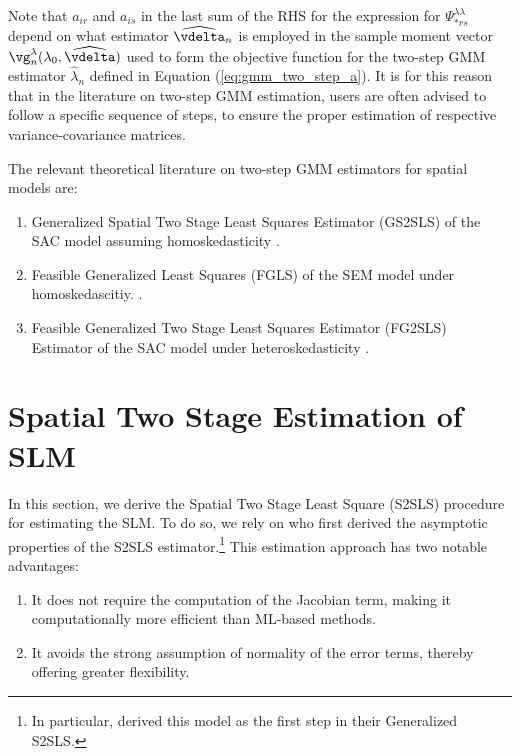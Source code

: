\documentclass[english,12pt]{book}\usepackage[]{graphicx}\usepackage[]{xcolor}
\begin{document}
Note that $a_{ir}$ and $a_{is}$ in the last sum of the RHS for the expression for $\Psi_{*rs}^{\lambda\lambda}$ depend on what estimator $\widehat{\vdelta}_n$ is employed in the sample moment vector $\vg_n^{\lambda}(\lambda_0, \widehat{\vdelta})$ used to form the objective function for the two-step GMM estimator $\widehat{\lambda}_n$ defined in Equation (\ref{eq:gmm_two_step_a}). It is for this reason that in the literature on two-step GMM estimation, users are often advised to follow a specific sequence of steps, to ensure the proper estimation of respective variance-covariance matrices. 

The relevant theoretical literature on two-step GMM estimators for spatial models are:
\begin{enumerate}
  \item Generalized Spatial Two Stage Least Squares Estimator (GS2SLS) of the SAC model assuming homoskedasticity \citep{kelejian1998generalized}.
  \item Feasible Generalized Least Squares (FGLS) of the SEM model under homoskedascitiy. \citep{kelejian1999generalized}.
  \item Feasible Generalized Two Stage Least Squares Estimator (FG2SLS) Estimator of the SAC model under heteroskedasticity \citep{kelejian2010specification}.
\end{enumerate}

\section{Spatial Two Stage Estimation of SLM}\label{sec:s2sls}

In this section, we derive the Spatial Two Stage Least Square (S2SLS) procedure for estimating the SLM. To do so, we rely on \cite{kelejian1998generalized} who first derived the asymptotic properties of the S2SLS estimator.\footnote{In particular, \cite{kelejian1998generalized} derived this model as the first step in their Generalized S2SLS.} This estimation approach has two notable advantages:
\begin{enumerate}
  \item It does not require the computation of the Jacobian term, making it computationally more efficient than ML-based methods. 
  \item It avoids the strong assumption of normality of the error terms, thereby offering greater flexibility.
\end{enumerate}
\end{document}
